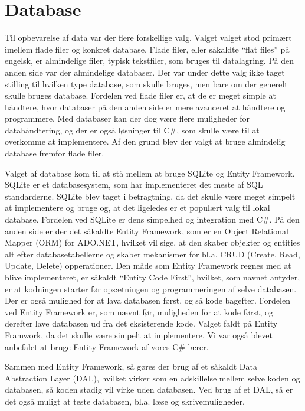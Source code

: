 \section{Database}
Til opbevarelse af data var der flere forskellige valg. Valget valget stod primært imellem flade filer og konkret database. 
Flade filer, eller såkaldte ``flat files'' på engelsk, er almindelige filer, typisk tekstfiler, som bruges til datalagring. 
På den anden side var der almindelige databaser. Der var under dette valg ikke taget stilling til hvilken type database, som skulle bruges, men bare om der generelt skulle bruges database. 
Fordelen ved flade filer er, at de er meget simple at håndtere, hvor databaser på den anden side er mere avanceret at håndtere og programmere. 
Med databaser kan der dog være flere muligheder for datahåndtering, og der er også løsninger til C\#, som skulle være til at overkomme at implementere.\citep{flatfiles} Af den grund blev der valgt at bruge almindelig database fremfor flade filer. 

Valget af database kom til at stå mellem at bruge SQLite og Entity Framework. SQLite er et databasesystem, som har implementeret det meste af SQL standarderne.
SQLite blev taget i betragtning, da det skulle være meget simpelt at implementere og bruge og, at det ligeledes er et populært valg til lokal database. 
Fordelen ved SQLite er dens simpelhed og integration med C\#. 
På den anden side er der det såkaldte Entity Framework, som er en Object Relational Mapper (ORM) for ADO.NET, hvilket vil sige, at den skaber objekter og entities alt efter databasetabellerne og skaber mekanismer for bl.a. CRUD (Create, Read, Update, Delete) opperationer. \citep{entity} 
Den måde som Entity Framework regnes med at blive implementeret, er såkaldt ``Entity Code First'', hvilket, som navnet antyder, er at kodningen starter før opsætningen og programmeringen af selve databasen. Der er også mulighed for at lava databasen først, og så kode bagefter.
Fordelen ved Entity Framework er, som nævnt før, muligheden for at kode først, og derefter lave databasen ud fra det eksisterende kode. 
Valget faldt på Entity Framwork, da det skulle være simpelt at implementere. Vi var også blevet anbefalet at bruge Entity Framework af vores C\#-lærer.

Sammen med Entity Framework, så gøres der brug af et såkaldt Data Abstraction Layer (DAL), hvilket virker som en adskillelse mellem selve koden og databasen, så koden stadig vil virke uden databasen. 
Ved brug af et DAL, så er det også muligt at teste databasen, bl.a. læse og skrivemuligheder. 
